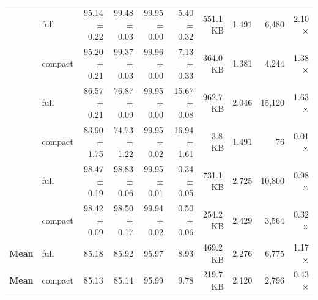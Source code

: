 \begin{table}[!t]
\begin{tabular}{llrrrrrrrr}
\addlinespace
\multirow{2}{*}{CICIoMT2024} & full & 95.14$\pm$0.22 & 99.48$\pm$0.03 & 99.95$\pm$0.00 & 5.40$\pm$0.32 & 551.1\,KB & 1.491 & 6,480 & 2.10$\times$ \\
 & compact & 95.20$\pm$0.21 & 99.37$\pm$0.03 & 99.96$\pm$0.00 & 7.13$\pm$0.33 & 364.0\,KB & 1.381 & 4,244 & 1.38$\times$ \\
\addlinespace
\multirow{2}{*}{Edge-IIoTset} & full & 86.57$\pm$0.21 & 76.87$\pm$0.09 & 99.95$\pm$0.00 & 15.67$\pm$0.08 & 962.7\,KB & 2.046 & 15,120 & 1.63$\times$ \\
 & compact & 83.90$\pm$1.75 & 74.73$\pm$1.22 & 99.95$\pm$0.02 & 16.94$\pm$1.61 & 3.8\,KB & 1.491 & 76 & 0.01$\times$ \\
\addlinespace
\multirow{2}{*}{TON-IoT} & full & 98.47$\pm$0.19 & 98.83$\pm$0.06 & 99.95$\pm$0.01 & 0.34$\pm$0.05 & 731.1\,KB & 2.725 & 10,800 & 0.98$\times$ \\
 & compact & 98.42$\pm$0.09 & 98.50$\pm$0.17 & 99.94$\pm$0.02 & 0.50$\pm$0.06 & 254.2\,KB & 2.429 & 3,564 & 0.32$\times$ \\
\addlinespace
\midrule \textbf{Mean} & full & 85.18 & 85.92 & 95.97 & 8.93 & 469.2\,KB & 2.276 & 6,775 & 1.17$\times$ \\
\textbf{Mean} & compact & 85.13 & 85.14 & 95.99 & 9.78 & 219.7\,KB & 2.120 & 2,796 & 0.43$\times$ \\
\bottomrule
\end{tabular}
\end{table}
